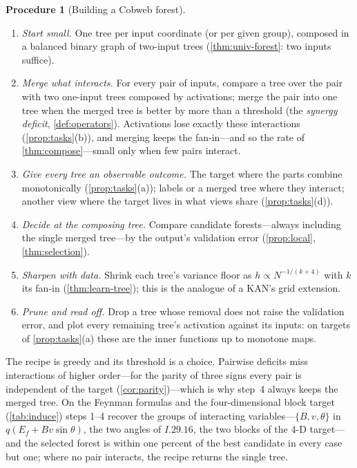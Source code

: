 \documentclass[11pt]{article}
\theoremstyle{definition}
\newtheorem{procedure}[theorem]{Procedure}
\theoremstyle{remark}
\begin{document}
\begin{procedure}[Building a Cobweb forest]\label{proc:recipe}
\leavevmode
\begin{enumerate}[leftmargin=*]
\item \emph{Start small.}  One tree per input coordinate (or per given group), composed in
  a balanced binary graph of two-input trees (\cref{thm:univ-forest}: two inputs suffice).
\item \emph{Merge what interacts.}  For every pair of inputs, compare a tree over the pair
  with two one-input trees composed by activations; merge the pair into one tree when the
  merged tree is better by more than a threshold (the \emph{synergy deficit},
  \cref{def:operators}).  Activations lose exactly these interactions
  (\cref{prop:tasks}(b)), and merging keeps the fan-in---and so the rate of
  \cref{thm:compose}---small only when few pairs interact.
\item \emph{Give every tree an observable outcome.}  The target where the parts combine
  monotonically (\cref{prop:tasks}(a)); labels or a merged tree where they interact; another
  view where the target lives in what views share (\cref{prop:tasks}(d)).
\item \emph{Decide at the composing tree.}  Compare candidate forests---always including
  the single merged tree---by the output's validation error (\cref{prop:local},
  \cref{thm:selection}).
\item \emph{Sharpen with data.}  Shrink each tree's variance floor as
  $h\propto N^{-1/(k+4)}$ with $k$ its fan-in (\cref{thm:learn-tree}); this is the analogue of
  a KAN's grid extension.
\item \emph{Prune and read off.}  Drop a tree whose removal does not raise the validation
  error, and plot every remaining tree's activation against its inputs: on targets of
  \cref{prop:tasks}(a) these are the inner functions up to monotone maps.
\end{enumerate}
\end{procedure}

The recipe is greedy and its threshold is a choice.  Pairwise deficits miss interactions of
higher order---for the parity of three signs every pair is independent of the target
(\cref{cor:parity})---which is why step~4 always keeps the merged tree.  On the Feynman formulas and the four-dimensional block target
(\cref{tab:induce}) steps 1--4 recover the groups of interacting variables---$\{B,v,\theta\}$ in
$q(E_f+Bv\sin\theta)$, the two angles of $I.29.16$, the two blocks of the 4-D target---and the
selected forest is within one percent of the best candidate in every case but one; where no
pair interacts, the recipe returns the single tree.
\end{document}

